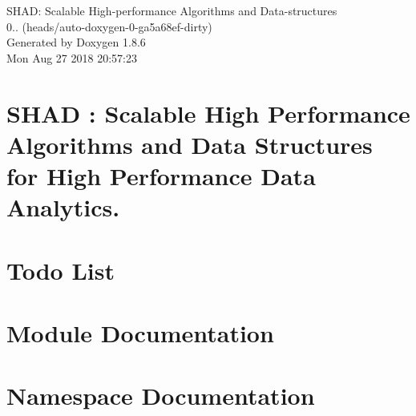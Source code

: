 \documentclass[twoside]{book}
\newcommand{\clearemptydoublepage}{%
  \newpage{\pagestyle{empty}\cleardoublepage}%
}
\begin{document}
\hypersetup{pageanchor=false}
\begin{titlepage}
\vspace*{7cm}
\begin{center}%
{\Large S\-H\-A\-D\-: Scalable High-\/performance Algorithms and Data-\/structures \\[1ex]\large 0.. (heads/auto-\/doxygen-\/0-\/ga5a68ef-\/dirty) }\\
\vspace*{1cm}
{\large Generated by Doxygen 1.8.6}\\
\vspace*{0.5cm}
{\small Mon Aug 27 2018 20:57:23}\\
\end{center}
\end{titlepage}
\clearemptydoublepage
\tableofcontents
\clearemptydoublepage
{}
\hypersetup{pageanchor=true}

\chapter{S\-H\-A\-D \-: Scalable High Performance Algorithms and Data Structures for High Performance Data Analytics.}
\label{index}\hypertarget{index}{}
\chapter{Todo List}
\label{todo}
\hypertarget{todo}{}

\chapter{Module Documentation}










\chapter{Namespace Documentation}


\end{document}
